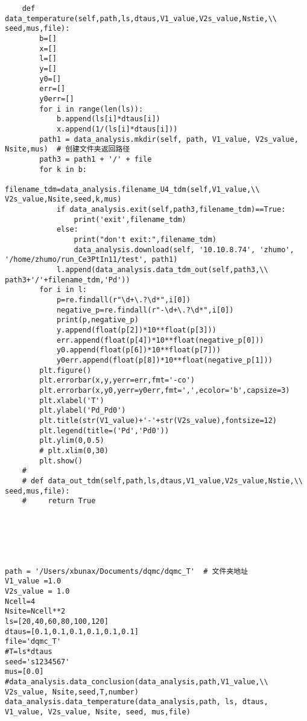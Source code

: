 \begin{description}
\begin{lstlisting}
    def data_temperature(self,path,ls,dtaus,V1_value,V2s_value,Nstie,\\ seed,mus,file):
        b=[]
        x=[]
        l=[]
        y=[]
        y0=[]
        err=[]
        y0err=[]
        for i in range(len(ls)):
            b.append(ls[i]*dtaus[i])
            x.append(1/(ls[i]*dtaus[i]))
        path1 = data_analysis.mkdir(self, path, V1_value, V2s_value, Nsite,mus)  # 创建文件夹返回路径
        path3 = path1 + '/' + file
        for k in b:
            filename_tdm=data_analysis.filename_U4_tdm(self,V1_value,\\ V2s_value,Nsite,seed,k,mus)
            if data_analysis.exit(self,path3,filename_tdm)==True:
                print('exit',filename_tdm)
            else:
                print("don't exit:",filename_tdm)
                data_analysis.download(self, '10.10.8.74', 'zhumo', '/home/zhumo/run_Ce3PtIn11/test', path1)
            l.append(data_analysis.data_tdm_out(self,path3,\\ path3+'/'+filename_tdm,'Pd'))
        for i in l:
            p=re.findall(r"\d+\.?\d*",i[0])
            negative_p=re.findall(r"-\d+\.?\d*",i[0])
            print(p,negative_p)
            y.append(float(p[2])*10**float(p[3]))
            err.append(float(p[4])*10**float(negative_p[0]))
            y0.append(float(p[6])*10**float(p[7]))
            y0err.append(float(p[8])*10**float(negative_p[1]))
        plt.figure()
        plt.errorbar(x,y,yerr=err,fmt='-co')
        plt.errorbar(x,y0,yerr=y0err,fmt=',',ecolor='b',capsize=3)
        plt.xlabel('T')
        plt.ylabel('Pd_Pd0')
        plt.title(str(V1_value)+'-'+str(V2s_value),fontsize=12)
        plt.legend(title=('Pd','Pd0'))
        plt.ylim(0,0.5)
        # plt.xlim(0,30)
        plt.show()
    #
    # def data_out_tdm(self,path,ls,dtaus,V1_value,V2s_value,Nstie,\\ seed,mus,file):
    #     return True






path = '/Users/xbunax/Documents/dqmc/dqmc_T'  # 文件夹地址
V1_value =1.0
V2s_value = 1.0
Ncell=4
Nsite=Ncell**2
ls=[20,40,60,80,100,120]
dtaus=[0.1,0.1,0.1,0.1,0.1,0.1]
file='dqmc_T'
#T=ls*dtaus
seed='s1234567'
mus=[0.0]
#data_analysis.data_conclusion(data_analysis,path,V1_value,\\ V2s_value, Nsite,seed,T,number)
data_analysis.data_temperature(data_analysis,path, ls, dtaus, V1_value, V2s_value, Nsite, seed, mus,file)





	\end{lstlisting}
\end{description}
